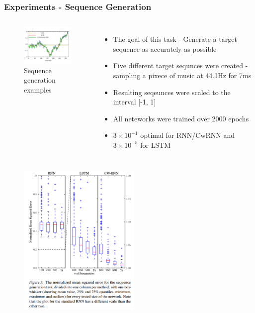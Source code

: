 \documentclass{beamer}
\begin{document}
{
   \frametitle{Experiments - Sequence Generation}
   \begin{columns}
		\begin{figure}[ht]  
			\begin{center}
				\includegraphics[width=1.8in]{Images/cwrnn_graph.png}   
			\end{center}   
			\caption{\centering Sequence generation examples}
		\end{figure}
		\begin{itemize}		
			\item The goal of this task - Generate a target sequence as accurately as possible
			\item Five different target sequnces were created - sampling a pixece of music at 44.1Hz for 7ms
			\item Resulting seqeunces were scaled to the interval [-1, 1]
			\item All neteworks were trained over 2000 epochs
			\item ${3\times10^{-1}}$ optimal for RNN/CwRNN and ${3\times10^{-5}}$ for LSTM
		\end{itemize}
	\end{columns}
}
\frame
{
	\begin{figure}[ht]  
		\begin{center}
			\includegraphics[width=2.3in]{Images/cwrnn_sequence_result.png}   
		\end{center}   
	\end{figure}
}
\end{document}
